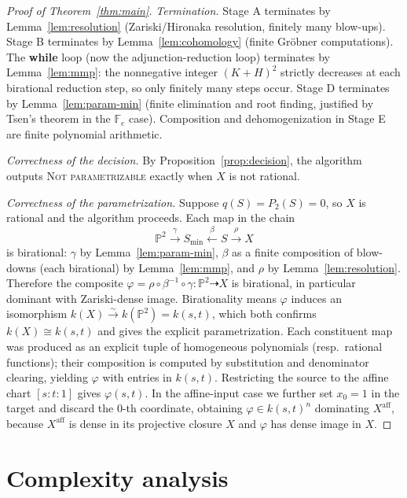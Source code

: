 \documentclass{amsart}
\theoremstyle{plain}
\theoremstyle{definition}
\newcommand{\PP}{\mathbb{P}}
\begin{document}
\begin{proof}[Proof of Theorem~\ref{thm:main}]
\emph{Termination.}  Stage A terminates by Lemma~\ref{lem:resolution}
(Zariski/Hironaka resolution, finitely many blow-ups).  Stage B terminates by
Lemma~\ref{lem:cohomology} (finite Gr\"obner computations).  The
\textbf{while} loop (now the adjunction-reduction loop) terminates by
Lemma~\ref{lem:mmp}: the nonnegative integer $(K+H)^2$ strictly decreases at each
birational reduction step, so only finitely many steps occur.  Stage D terminates by Lemma~\ref{lem:param-min} (finite
elimination and root finding, justified by Tsen's theorem in the $\mathbb F_e$
case).  Composition and dehomogenization in Stage E are finite polynomial
arithmetic.

\emph{Correctness of the decision.}  By Proposition~\ref{prop:decision}, the
algorithm outputs \textsc{Not parametrizable} exactly when $X$ is not rational.

\emph{Correctness of the parametrization.}  Suppose $q(S)=P_2(S)=0$, so $X$ is
rational and the algorithm proceeds.  Each map in the chain
\[
\PP^2 \xrightarrow{\ \gamma\ } S_{\min}
\xleftarrow{\ \beta\ } S \xrightarrow{\ \rho\ } X
\]
is birational: $\gamma$ by Lemma~\ref{lem:param-min}, $\beta$ as a finite
composition of blow-downs (each birational) by Lemma~\ref{lem:mmp}, and $\rho$
by Lemma~\ref{lem:resolution}.  Therefore the composite
$\varphi=\rho\circ\beta^{-1}\circ\gamma\colon\PP^2\dashrightarrow X$ is
birational, in particular dominant with Zariski-dense image.  Birationality
means $\varphi$ induces an isomorphism $k(X)\xrightarrow{\sim}k(\PP^2)=k(s,t)$,
which both confirms $k(X)\cong k(s,t)$ and gives the explicit parametrization.
Each constituent map was produced as an explicit tuple of homogeneous
polynomials (resp.\ rational functions); their composition is computed by
substitution and denominator clearing, yielding $\varphi$ with entries in
$k(s,t)$.  Restricting the source to the affine chart $[s:t:1]$ gives
$\varphi(s,t)$.  In the affine-input case we further set $x_0=1$ in the target
and discard the $0$-th coordinate, obtaining $\varphi\in k(s,t)^n$ dominating
$X^{\mathrm{aff}}$, because $X^{\mathrm{aff}}$ is dense in its projective closure
$X$ and $\varphi$ has dense image in $X$.
\end{proof}

\section{Complexity analysis}
\end{document}
